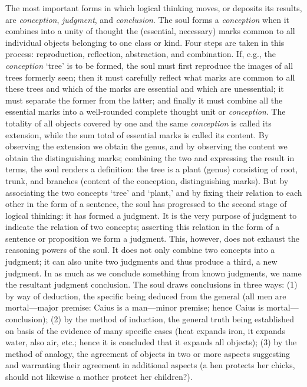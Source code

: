 The most important forms in which logical thinking moves, or deposits its results, are \emph{conception}, \emph{judgment}, and \emph{conclusion}. The soul forms a \emph{conception} when it combines into a unity of thought the (essential, necessary) marks common to all individual objects belonging to one class or kind. Four steps are taken in this process: reproduction, reflection, abstraction, and combination. If, e.g., the \emph{conception} ‘tree’ is to be formed, the soul must first reproduce the images of all trees formerly seen; then it must carefully reflect what marks are common to all these trees and which of the marks are essential and which are unessential; it must separate the former from the latter; and finally it must combine all the essential marks into a well-rounded complete thought unit or \emph{conception}. The totality of all objects covered by one and the same \emph{conception} is called its extension, while the sum
total of essential marks is called its content. By observing the extension we obtain the genus, and by observing the content we obtain the distinguishing marks; combining the two and expressing the result in terms, the soul renders a definition: the tree is a plant (genus) consisting of root, trunk, and branches (content of the conception, distinguishing marks). But by associating the two concepts ‘tree’ and ‘plant,’ and by fixing their relation to each other in the form of a sentence, the soul has progressed to the second stage of logical thinking: it has formed a judgment. It is the very purpose of judgment to indicate the relation of two concepts; asserting this relation in the form of a sentence or proposition we form a judgment. This, however, does not exhaust the reasoning powers of the soul. It does not only combine two concepts into a judgment; it can also unite two judgments and thus produce a third, a new judgment. In as much as we conclude something from known judgments, we name the resultant judgment conclusion. The soul draws conclusions in three ways: (1) by way of deduction, the specific being deduced from the general (all men are mortal—major premise: Caius is a man—minor premise; hence Caius is mortal—conclusion); (2) by the method of induction, the general truth being established on basis of the evidence of many specific cases (heat expands iron, it expands water, also air, etc.; hence it is concluded that it expands all objects); (3) by the method of analogy, the agreement of objects in two or more aspects suggesting and warranting their agreement in additional aspects (a hen protects her chicks, should not likewise a mother protect her children?).

